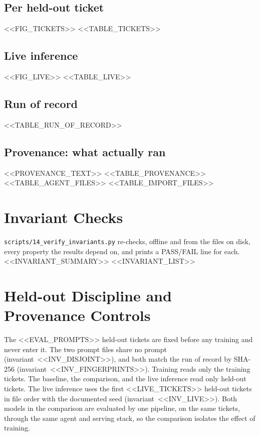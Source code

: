 \documentclass[11pt]{article}
\begin{document}
\subsection{Per held-out ticket}
<<FIG_TICKETS>>
<<TABLE_TICKETS>>

\subsection{Live inference}
<<FIG_LIVE>>
<<TABLE_LIVE>>

\subsection{Run of record}
<<TABLE_RUN_OF_RECORD>>

\subsection{Provenance: what actually ran}
<<PROVENANCE_TEXT>>
<<TABLE_PROVENANCE>>
<<TABLE_AGENT_FILES>>
<<TABLE_IMPORT_FILES>>

\section{Invariant Checks}
\texttt{scripts/14\_verify\_invariants.py} re-checks, offline and from the files on disk, every property the
results depend on, and prints a PASS/FAIL line for each. <<INVARIANT_SUMMARY>>
<<INVARIANT_LIST>>

\section{Held-out Discipline and Provenance Controls}
The <<EVAL_PROMPTS>> held-out tickets are fixed before any training and never enter it. The two prompt files
share no prompt (invariant~<<INV_DISJOINT>>), and both match the run of record by SHA-256
(invariant~<<INV_FINGERPRINTS>>). Training reads only the training tickets. The baseline, the comparison, and
the live inference read only held-out tickets. The live inference uses the first <<LIVE_TICKETS>> held-out
tickets in file order with the documented seed (invariant~<<INV_LIVE>>). Both models in the comparison are
evaluated by one pipeline, on the same tickets, through the same agent and serving stack, so the comparison
isolates the effect of training.
\end{document}
